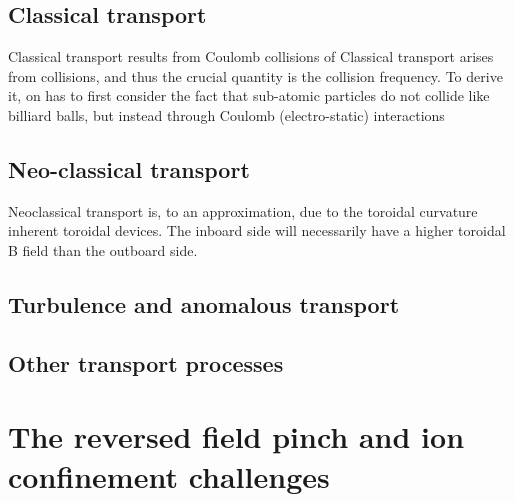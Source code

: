 \begin{refsection}
\subsection{Classical transport}

Classical transport results from Coulomb collisions of 
Classical transport arises from collisions, and thus the crucial quantity is the collision frequency. To derive it, on has to first consider the fact that sub-atomic particles do not collide like billiard balls, but instead through Coulomb (electro-static) interactions

\subsection{Neo-classical transport}

Neoclassical transport is, to an approximation, due to the toroidal curvature inherent toroidal devices. The inboard side will necessarily have a higher toroidal B field than the outboard side.

\subsection{Turbulence and anomalous transport}

\subsection{Other transport processes}

\section{The reversed field pinch and ion confinement challenges}


\end{refsection}
